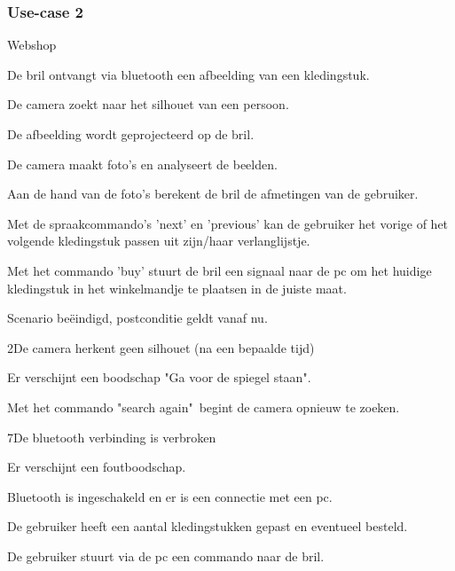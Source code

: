 \documentclass[12pt,a4paper,oneside]{article}
\begin{document}
\subsubsection{Use-case 2}
\begin{uc}{Webshop}

    \begin{uc-mss}{}
    \item De bril ontvangt via bluetooth een afbeelding van een kledingstuk.
    \item De camera zoekt naar het silhouet van een persoon.
    \item De afbeelding wordt geprojecteerd op de bril.
    \item De camera maakt foto's en analyseert de beelden.
    \item Aan de hand van de foto's berekent de bril de afmetingen van de gebruiker.
    \item Met de spraakcommando's 'next' en 'previous' kan de gebruiker het vorige of het volgende kledingstuk passen uit zijn/haar verlanglijstje.
    \item Met het commando 'buy' stuurt de bril een signaal naar de pc om het huidige kledingstuk in het winkelmandje te plaatsen in de juiste maat.
\item Scenario be\"eindigd, postconditie geldt vanaf nu.
    \end{uc-mss}

    \begin{uc-ext}

        \begin{uc-fail}{2}{De camera herkent geen silhouet (na een bepaalde tijd)}
        \item Er verschijnt een boodschap "Ga voor de spiegel staan".
        \item Met het commando "search again"\, begint de camera opnieuw te zoeken.
        \end{uc-fail}
        
        \begin{uc-fail}{7}{De bluetooth verbinding is verbroken}
        \item Er verschijnt een foutboodschap.
        \end{uc-fail}

    \end{uc-ext}

    \begin{uc-pre}
    \item Bluetooth is ingeschakeld en er is een connectie met een pc.
    \end{uc-pre}

    \begin{uc-post}
    \item De gebruiker heeft een aantal kledingstukken gepast en eventueel besteld.
    \end{uc-post}

    \begin{uc-trig}
    \item De gebruiker stuurt via de pc een commando naar de bril.
    \end{uc-trig}

\end{uc}
\setcounter{section}{3}
\end{document}
